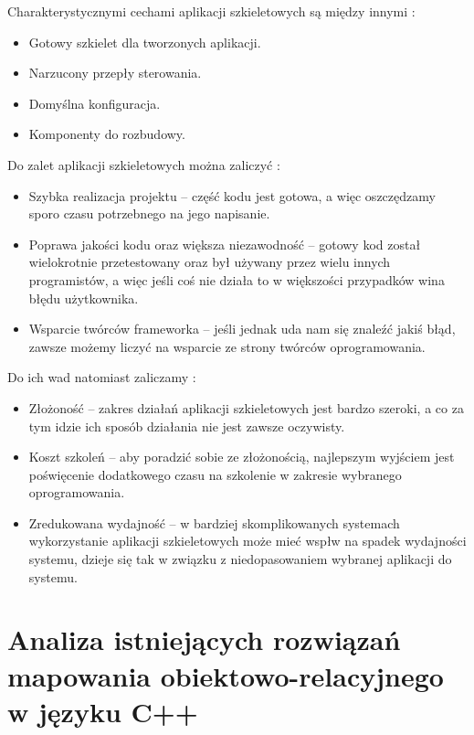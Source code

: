 \documentclass[12pt]{report}
\begin{document}
Charakterystycznymi cechami aplikacji szkieletowych są między innymi \cite{framework}:

\begin{itemize}
\item Gotowy szkielet dla tworzonych aplikacji.
\item Narzucony przepły sterowania.
\item Domyślna konfiguracja.
\item Komponenty do rozbudowy.
\end{itemize}

Do zalet aplikacji szkieletowych można zaliczyć \cite{framework}:

\begin{itemize}
\item Szybka realizacja projektu -- część kodu jest gotowa, a więc oszczędzamy sporo czasu potrzebnego na jego napisanie.
\item Poprawa jakości kodu oraz większa niezawodność -- gotowy kod został wielokrotnie przetestowany oraz był używany przez wielu innych programistów, a więc jeśli coś
nie działa to w większości przypadków wina błędu użytkownika.
\item Wsparcie twórców frameworka -- jeśli jednak uda nam się znaleźć jakiś błąd, zawsze możemy liczyć na wsparcie ze strony twórców oprogramowania.
\end{itemize}

Do ich wad natomiast zaliczamy \cite{framework}:

\begin{itemize}
\item Złożoność -- zakres działań aplikacji szkieletowych jest bardzo szeroki, a co za tym idzie ich sposób działania nie jest zawsze oczywisty.
\item Koszt szkoleń -- aby poradzić sobie ze złożonością, najlepszym wyjściem jest poświęcenie dodatkowego czasu na szkolenie w zakresie wybranego oprogramowania.
\item Zredukowana wydajność -- w bardziej skomplikowanych systemach wykorzystanie aplikacji szkieletowych może mieć wspłw na spadek wydajności systemu, dzieje się
tak w związku z niedopasowaniem wybranej aplikacji do systemu.
\end{itemize}

\chapter[Analiza istniejących rozwiązań]{Analiza istniejących rozwiązań mapowania obiektowo-relacyjnego w języku C++} \label{analiza}
\end{document}

